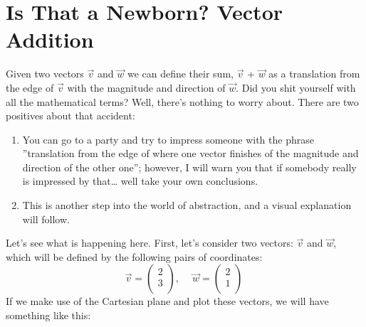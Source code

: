 \documentclass[a4,12pt,twosided,openany]{memoir}
\begin{document}
\section{Is That a Newborn? Vector Addition}
\par 
\indent
Given two vectors $\overrightarrow{v}$ and $\overrightarrow{w}$ we can define their sum, $\overrightarrow{v}$ + $\overrightarrow{w}$ as a translation from the edge of $\overrightarrow{v}$ with the magnitude and direction of $\overrightarrow{w}$. Did you shit yourself with  all the mathematical terms? Well, there’s nothing to worry about. There are two positives about that accident:
\begin{enumerate}
\item You can go to a party and try to impress someone with the phrase ”translation from the edge of where one vector finishes of the magnitude and direction of the other one”; however, I will warn you that if somebody really is impressed by that… well take your own conclusions.
\item This is another step into the world of abstraction, and a visual explanation will follow.
\end{enumerate}
\par 
\indent
Let’s see what is happening here. First, let’s consider two vectors: $\overrightarrow{v}$ and $\overrightarrow{w}$, which will be defined by the following pairs of coordinates:
\[\overrightarrow{v} = \begin{pmatrix}
 2\\
 3\\
\end{pmatrix}, \quad \
\overrightarrow{w} = \begin{pmatrix}
 2\\
 1\\
\end{pmatrix}\
\]
If we make use of the Cartesian plane and plot these vectors, we will have something like this:
\newpage
\end{document}
